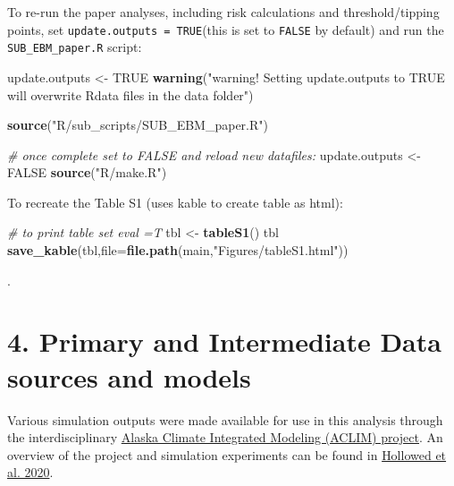 \documentclass[]{article}
\newenvironment{Shaded}{\begin{snugshade}}{\end{snugshade}}
\newcommand{\KeywordTok}[1]{\textcolor[rgb]{0.13,0.29,0.53}{\textbf{{#1}}}}
\newcommand{\DataTypeTok}[1]{\textcolor[rgb]{0.13,0.29,0.53}{{#1}}}
\newcommand{\StringTok}[1]{\textcolor[rgb]{0.31,0.60,0.02}{{#1}}}
\newcommand{\CommentTok}[1]{\textcolor[rgb]{0.56,0.35,0.01}{\textit{{#1}}}}
\newcommand{\OtherTok}[1]{\textcolor[rgb]{0.56,0.35,0.01}{{#1}}}
\newcommand{\NormalTok}[1]{{#1}}
\begin{document}
To re-run the paper analyses, including risk calculations and
threshold/tipping points, set \texttt{update.outputs\ =\ TRUE}(this is
set to \texttt{FALSE} by default) and run the \texttt{SUB\_EBM\_paper.R}
script:

\begin{Shaded}
\begin{Highlighting}[]
    \NormalTok{update.outputs  <-}\StringTok{ }\OtherTok{TRUE}  
    \KeywordTok{warning}\NormalTok{(}\StringTok{"warning! Setting update.outputs to TRUE will overwrite Rdata files in the data folder"}\NormalTok{)}

    \KeywordTok{source}\NormalTok{(}\StringTok{"R/sub_scripts/SUB_EBM_paper.R"}\NormalTok{)}

    \CommentTok{# once complete set to FALSE and reload new datafiles:}
    \NormalTok{update.outputs  <-}\StringTok{ }\OtherTok{FALSE}  
    \KeywordTok{source}\NormalTok{(}\StringTok{"R/make.R"}\NormalTok{)}
\end{Highlighting}
\end{Shaded}

To recreate the Table S1 (uses kable to create table as html):

\begin{Shaded}
\begin{Highlighting}[]
    \CommentTok{# to print table set eval =T}
    \NormalTok{tbl <-}\StringTok{ }\KeywordTok{tableS1}\NormalTok{()}
    \NormalTok{tbl}
    \KeywordTok{save_kable}\NormalTok{(tbl,}\DataTypeTok{file=}\KeywordTok{file.path}\NormalTok{(main,}\StringTok{"Figures/tableS1.html"}\NormalTok{))}
\end{Highlighting}
\end{Shaded}

.

\section{4. Primary and Intermediate Data sources and
models}\label{primary-and-intermediate-data-sources-and-models}

Various simulation outputs were made available for use in this analysis
through the interdisciplinary
\href{\%22https://www.fisheries.noaa.gov/alaska/ecosystems/alaska-climate-integrated-modeling-project\%22}{Alaska
Climate Integrated Modeling (ACLIM) project}. An overview of the project
and simulation experiments can be found in
\href{\%22https://www.frontiersin.org/articles/10.3389/fmars.2019.00775/full\%22}{Hollowed
et al. 2020}.
\end{document}
